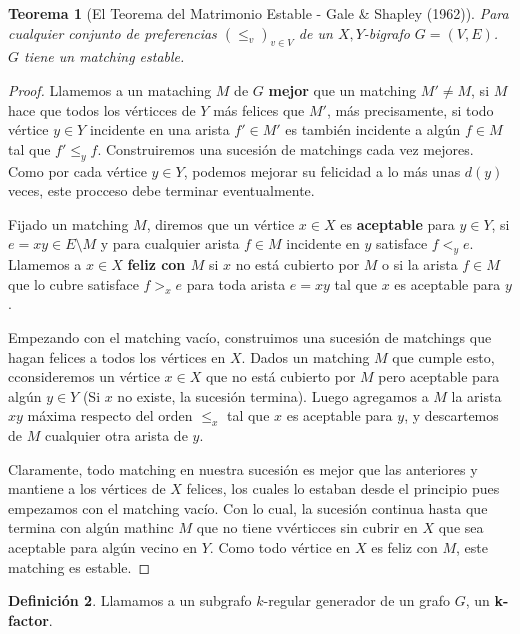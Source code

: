 \documentclass[12pt]{report}
\theoremstyle{plain}
\newtheorem{theorem}{Teorema}[section]
\theoremstyle{definition}
\newtheorem{definition}[theorem]{Definición}
\begin{document}
\begin{theorem}[El Teorema del Matrimonio Estable - Gale \& Shapley (1962)]\label{th:teorema del matrimonio estable}
Para cualquier conjunto de preferencias $(\leq_v)_{v \in V}$ de un $X,Y$-bigrafo $G = (V,E)$. $G$ tiene un matching estable.
\end{theorem}
\begin{proof}
Llamemos a un mataching $M$ de $G$ \textbf{mejor} que un matching $M' \neq M$, si $M$ hace que todos los vérticces de $Y$ más felices que $M'$, más precisamente, si todo vértice $y \in Y$ incidente en una arista $f' \in M'$ es también incidente a algún $f \in M$ tal que $f' \leq_y f$. Construiremos una sucesión de matchings cada vez mejores. Como por cada vértice $y \in Y$, podemos mejorar su felicidad a lo más unas $d(y)$ veces, este procceso debe terminar eventualmente.

Fijado un matching $M$, diremos que un vértice $x \in X$ es \textbf{aceptable} para $y \in Y$, si $e = xy \in E \setminus M$ y para cualquier arista $f \in M$ incidente en $y$ satisface $f <_y e$. Llamemos a $x \in X$ \textbf{feliz con $M$} si $x$ no está cubierto por $M$ o si la arista $f \in M$ que lo cubre satisface $f >_x e$ para toda arista $e = xy$ tal que $x$ es aceptable para $y$.

Empezando con el matching vacío, construimos una sucesión de matchings que hagan felices a todos los vértices en $X$. Dados un matching $M$ que cumple esto, cconsideremos un vértice $x \in X$ que no está cubierto por $M$ pero aceptable para algún $y \in Y$ (Si $x$ no existe, la sucesión termina). Luego agregamos a $M$ la arista $xy$ máxima respecto del orden $\leq_x$ tal que $x$ es aceptable para $y$, y descartemos de $M$ cualquier otra arista de $y$.

Claramente, todo matching en nuestra sucesión es mejor que las anteriores y mantiene a los vértices de $X$ felices, los cuales lo estaban desde el principio pues empezamos con el matching vacío. Con lo cual, la sucesión continua hasta que termina con algún mathinc $M$ que no tiene vvérticces sin cubrir en $X$ que sea aceptable para algún vecino en $Y$. Como todo vértice en $X$ es feliz con $M$, este matching es estable.
\end{proof}


\begin{definition}
Llamamos a un subgrafo $k$-regular generador de un grafo $G$, un \textbf{k-factor}.
\end{definition}
\end{document}
